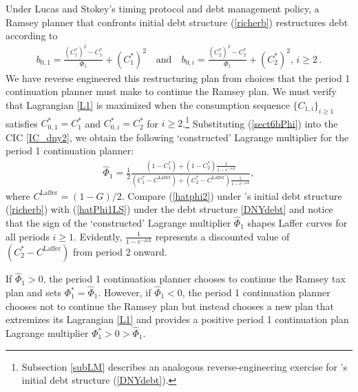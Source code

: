 \documentclass[12pt]{article}
\begin{document}
Under Lucas and Stokey's timing protocol and debt management policy, a  Ramsey planner  that confronts initial debt structure  (\ref{richerb})   restructures debt according to %
\begin{eqnarray}
b_{0, 1} = \frac{(C_{1}^*)^2-C_{ 1}^*}{\Phi_1}+(C_{1}^*)^2 \quad \text{and} \quad 
b_{0, i} %
= \frac{(C_{ 2}^*)^2-C_{ 2}^*}{\Phi_1}+(C_{2}^*)^2,\, i\geq 2 \, .  \label{sect6bPhi} 
\end{eqnarray}
We have reverse engineered this restructuring plan from %
 choices that the period 1  continuation planner must make to continue the Ramsey plan.  We must verify that Lagrangian \eqref{L1} is maximized  when  the consumption sequence $\{C_{1, i}\}_{i\geq 1}$ satisfies  $C_{0,1}^\ast=C_1^\ast$ and $C_{0,i}^\ast=C_2^\ast$ for $i\geq 2$.\footnote{Subsection \ref{subLM} describes an analogous reverse-engineering 
 exercise for  \citeauthor{debortoli2021optimal}'s initial debt structure (\ref{DNYdebt}).} %
Substituting (\ref{sect6bPhi}) into the CIC \eqref{IC_dny2}, we obtain the following `constructed' Lagrange multiplier for the period 1 continuation planner: 
\begin{eqnarray}\label{hatphi2}
{\widehat\Phi_1}=\frac{1}{2}\frac{\left(1-C_{ 1}^*\right)+\left(1-C_{ 2}^*\right)\frac{1}{1-e^{-\rho\Delta}}}{\left(C_{ 1}^*-C^{\text{Laffer}}\right)+\left(C_{ 2}^*-C^{\text{Laffer}}\right)\frac{1}{1-e^{-\rho\Delta}}}  ,
\end{eqnarray}
where $C^{\text{Laffer}}=(1-G)/2$. Compare (\ref{hatphi2}) under  \citeauthor{debortoli2021optimal}'s initial debt structure (\ref{richerb}) with (\ref{hatPhi1LS}) under the debt structure \eqref{DNYdebt} and notice  that the sign of the `constructed' Lagrange multiplier ${\widehat\Phi_1}$ shapes  Laffer curves  for all periods $i\geq 1$. {Evidently, $\frac{1}{1-e^{-\rho\Delta}}$ represents a  discounted value of  $\left(C_{ 2}^*-C^{\text{Laffer}}\right)$  from period 2 onward.} 

If $\widehat \Phi_1>0$, the period 1 continuation planner chooses to continue the  Ramsey tax plan and sets $\Phi_1^*=\widehat \Phi_1$. However, if $\widehat \Phi_1<0$, the period 1 continuation planner chooses not to continue the Ramsey plan but instead chooses a new  plan that extremizes its Lagrangian \eqref{L1} and provides a positive  period 1 continuation plan Lagrange multiplier  %
$\Phi_1^*>0>\widehat \Phi_1$. %
\end{document}

